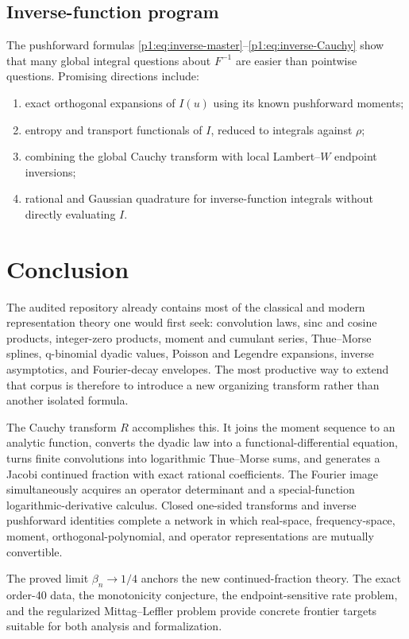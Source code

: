 \documentclass[11pt]{article}
\theoremstyle{definition}
\theoremstyle{remark}
\begin{document}
\subsection{Inverse-function program}

The pushforward formulas \eqref{p1:eq:inverse-master}--\eqref{p1:eq:inverse-Cauchy} show that
many global integral questions about \(F^{-1}\) are easier than pointwise questions.
Promising directions include:

\begin{enumerate}
\item exact orthogonal expansions of \(I(u)\) using its known pushforward moments;
\item entropy and transport functionals of \(I\), reduced to integrals against \(\rho\);
\item combining the global Cauchy transform with local Lambert--\(W\) endpoint inversions;
\item rational and Gaussian quadrature for inverse-function integrals without directly
      evaluating \(I\).
\end{enumerate}

\section{Conclusion}

The audited repository already contains most of the classical and modern representation
theory one would first seek: convolution laws, sinc and cosine products, integer-zero
products, moment and cumulant series, Thue--Morse splines, q-binomial dyadic values,
Poisson and Legendre expansions, inverse asymptotics, and Fourier-decay envelopes.  The
most productive way to extend that corpus is therefore to introduce a new organizing
transform rather than another isolated formula.

The Cauchy transform \(R\) accomplishes this.  It joins the moment sequence to an analytic
function, converts the dyadic law into a functional-differential equation, turns finite
convolutions into logarithmic Thue--Morse sums, and generates a Jacobi continued fraction
with exact rational coefficients.  The Fourier image simultaneously acquires an operator
determinant and a special-function logarithmic-derivative calculus.  Closed one-sided
transforms and inverse pushforward identities complete a network in which real-space,
frequency-space, moment, orthogonal-polynomial, and operator representations are mutually
convertible.

The proved limit \(\beta_n\to1/4\) anchors the new continued-fraction theory.  The exact
order-40 data, the monotonicity conjecture, the endpoint-sensitive rate problem, and the
regularized Mittag--Leffler problem provide concrete frontier targets suitable for both
analysis and formalization.
\end{document}
